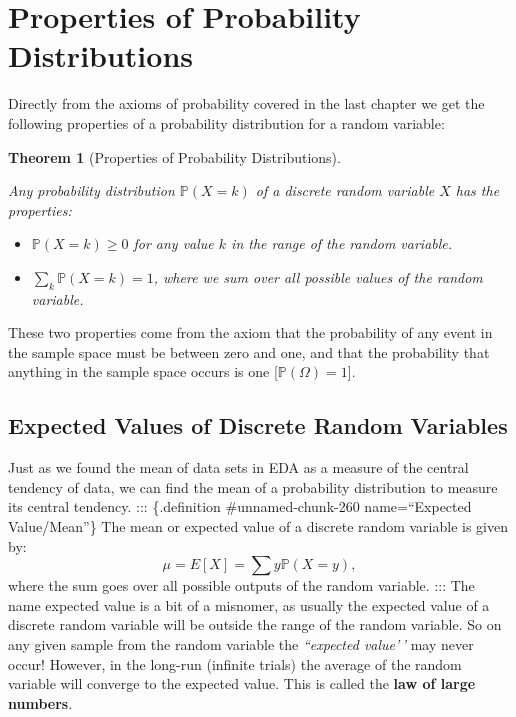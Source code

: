 \documentclass[
]{book}
\providecommand{\tightlist}{%
  \setlength{\itemsep}{0pt}\setlength{\parskip}{0pt}}
\newcommand{\prob}[1]{{\mathbb{P}(#1)}}
\newtheorem{theorem}{Theorem}[chapter]
\theoremstyle{definition}
\theoremstyle{definition}
\theoremstyle{definition}
\theoremstyle{definition}
\theoremstyle{remark}
\begin{document}
\hypertarget{properties-of-probability-distributions}{%
\section{Properties of Probability Distributions}\label{properties-of-probability-distributions}}

Directly from the axioms of probability covered in the last chapter we get the following properties of a probability distribution for a random variable:

\begin{theorem}[Properties of Probability Distributions]
\protect\hypertarget{thm:unnamed-chunk-259}{}\label{thm:unnamed-chunk-259}

Any probability distribution \(\prob{X=k}\) of a discrete random variable \(X\) has the properties:

\begin{itemize}
\tightlist
\item
  \(\prob{X=k}\geq 0\) for any value \(k\) in the range of the random variable.
\item
  \(\sum_k \prob{X=k}=1\), where we sum over all possible values of the random variable.
\end{itemize}

\end{theorem}

These two properties come from the axiom that the probability of any event in the sample space must be between zero and one, and that the probability that anything in the sample space occurs is one {[}\(\prob{\Omega}=1\){]}.

\hypertarget{expected-values-of-discrete-random-variables}{%
\subsection{Expected Values of Discrete Random Variables}\label{expected-values-of-discrete-random-variables}}

Just as we found the mean of data sets in EDA as a measure of the central tendency of data, we can find the mean of a probability distribution to measure its central tendency.
::: \{.definition \#unnamed-chunk-260 name=``Expected Value/Mean''\}
The mean or expected value of a discrete random variable is given by: \[\mu=E[X]=\sum y \prob{X=y},\] where the sum goes over all possible outputs of the random variable.
:::
The name expected value is a bit of a misnomer, as usually the expected value of a discrete random variable will be outside the range of the random variable. So on any given sample from the random variable the \emph{``expected value'\,'} may never occur! However, in the long-run (infinite trials) the average of the random variable will converge to the expected value. This is called the \textbf{law of large numbers}.
\end{document}
